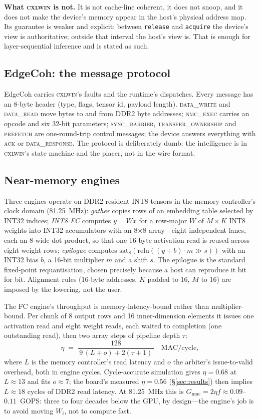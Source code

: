\documentclass[lettersize,journal]{IEEEtran}
\newcommand{\cxlwin}{\textsc{cxlwin}}
\begin{document}
\textbf{What \cxlwin{} is not.} It is not cache-line coherent, it does not snoop, and it does not make the device's memory appear in the host's physical address map. Its guarantee is weaker and explicit: between \texttt{release} and \texttt{acquire} the device's view is authoritative; outside that interval the host's view is. That is enough for layer-sequential inference and is stated as such.

\subsection{EdgeCoh: the message protocol}
EdgeCoh carries \cxlwin{}'s faults and the runtime's dispatches. Every message has an 8-byte header (type, flags, tensor id, payload length). \textsc{data\_write} and \textsc{data\_read} move bytes to and from DDR2 byte addresses; \textsc{nmc\_exec} carries an opcode and six 32-bit parameters; \textsc{sync\_barrier}, \textsc{transfer\_ownership} and \textsc{prefetch} are one-round-trip control messages; the device answers everything with \textsc{ack} or \textsc{data\_response}. The protocol is deliberately dumb: the intelligence is in \cxlwin{}'s state machine and the placer, not in the wire format.

\subsection{Near-memory engines}
Three engines operate on DDR2-resident INT8 tensors in the memory controller's clock domain (81.25~MHz):
\emph{gather} copies rows of an embedding table selected by INT32 indices;
\emph{INT8 FC} computes $y = W x$ for a row-major $W$ of $M{\times}K$ INT8 weights into INT32 accumulators with an 8$\times$8 array---eight independent lanes, each an 8-wide dot product, so that one 16-byte activation read is reused across eight weight rows;
\emph{epilogue} computes $\mathrm{sat}_8(\mathrm{relu}((y+b)\cdot m \gg s))$ with an INT32 bias $b$, a 16-bit multiplier $m$ and a shift $s$. The epilogue is the standard fixed-point requantisation, chosen precisely because a host can reproduce it bit for bit. Alignment rules (16-byte addresses, $K$ padded to 16, $M$ to 16) are imposed by the lowering, not the user.

The FC engine's throughput is memory-latency-bound rather than multiplier-bound. Per chunk of 8 output rows and 16 inner-dimension elements it issues one activation read and eight weight reads, each waited to completion (one outstanding read), then two array steps of pipeline depth $\tau$:
\begin{equation}
\eta \;=\; \frac{128}{\,9\,(L + o) + 2(\tau + 1)\,}\quad\text{MAC/cycle},
\label{eq:mac}
\end{equation}
where $L$ is the memory controller's read latency and $o$ the arbiter's issue-to-valid overhead, both in engine cycles. Cycle-accurate simulation gives $\eta = 0.68$ at $L \approx 13$ and fits $o \approx 7$; the board's measured $\eta = 0.56$ (\S\ref{sec:results}) then implies $L \approx 18$ cycles of DDR2 read latency. At 81.25~MHz this is $G_{\text{nmc}} = 2\eta f \approx 0.09$--$0.11$~GOPS: three to four decades below the GPU, by design---the engine's job is to avoid moving $W_i$, not to compute fast.
\end{document}
